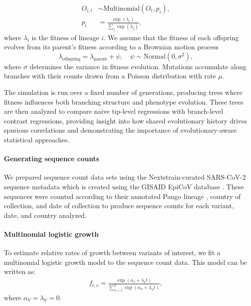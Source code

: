 \begin{align*}
    O_{i, t} &\sim \text{Multinomial}\left(O_t, p_{i}\right),\\
    p_i &= \frac{\exp(\lambda_i)}{\sum_j \exp(\lambda_j)},
\end{align*}
where $\lambda_i$ is the fitness of lineage $i$.
We assume that the fitness of each offspring evolves from its parent’s fitness according to a Brownian motion process
\begin{equation*}
    \lambda_{\text{offspring}} = \lambda_{\text{parent}} + \psi, \quad \psi \sim \text{Normal}(0, \sigma^2),
\end{equation*}
where $\sigma$ determines the variance in fitness evolution.
Mutations accumulate along branches with their counts drawn from a Poisson distribution with rate $\mu$.

The simulation is run over a fixed number of generations, producing trees where fitness influences both branching structure and phenotype evolution.
These trees are then analyzed to compare naive tip-level regressions with branch-level contrast regressions, providing insight into how shared evolutionary history drives spurious correlations and demonstrating the importance of evolutionary-aware statistical approaches.

\paragraph{Generating sequence counts}%

We prepared sequence count data sets using the Nextstrain-curated SARS-CoV-2 sequence metadata \cite{Hadfield2018} which is created using the GISAID EpiCoV database \cite{khare2021gisaid}.
These sequences were counted according to their annotated Pango lineage \cite{aksamentov2021nextclade}, country of collection, and date of collection to produce sequence counts for each variant, date, and country analyzed.

\paragraph{Multinomial logistic growth}

To estimate relative rates of growth between variants of interest, we fit a multinomial logistic growth model to the sequence count data.
This model can be written as:
\begin{align*}
    f_{t, v} = \frac{\exp(\alpha_{v} + \lambda_{v} t)}{\sum_{u=1}^{V} \exp(\alpha_{u} + \lambda_{u} t)},
\end{align*}
where $\alpha_{V} = \lambda_{V} = 0$.

